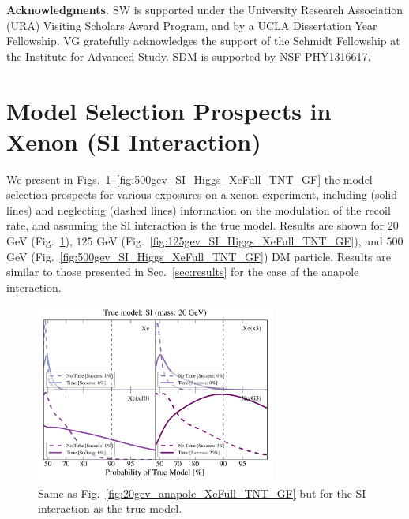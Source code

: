 \documentclass[11pt, a4paper]{article}
\newcommand{\Sec}[1]{Sec.~\ref{#1}} \newcommand{\Secs}[2]{Secs.~\ref{#1} and \ref{#2}} \newcommand{\Secm}[2]{Secs.~\ref{#1} through \ref{#2}}
\newcommand{\Fig}[1]{Fig.~\ref{#1}} \newcommand{\Figs}[2]{Figs.~\ref{#1} and \ref{#2}}
\begin{document}
\textbf{Acknowledgments.} SW is supported under the University Research Association (URA) Visiting Scholars Award Program, and by a UCLA Dissertation Year Fellowship. VG gratefully acknowledges the support of the Schmidt Fellowship at the Institute for Advanced Study. SDM is supported by NSF PHY1316617. %

\appendix

\section{Model Selection Prospects in Xenon (SI Interaction)}
We present in Figs.~\ref{fig:20gev_SI_Higgs_XeFull_TNT_GF}--\ref{fig:500gev_SI_Higgs_XeFull_TNT_GF} the model selection prospects for various exposures on a xenon experiment, including (solid lines) and neglecting (dashed lines) information on the modulation of the recoil rate, and assuming the SI interaction is the true model. Results are shown for $20$ GeV (\Fig{fig:20gev_SI_Higgs_XeFull_TNT_GF}), $125$ GeV (\Fig{fig:125gev_SI_Higgs_XeFull_TNT_GF}), and $500$ GeV (\Fig{fig:500gev_SI_Higgs_XeFull_TNT_GF}) DM particle. Results are similar to those presented in \Sec{sec:results} for the case of the anapole interaction. 


\begin{figure}
\centering
\includegraphics[width=0.7\textwidth]{plots/PDF_20GeV_SI_Higgs_50sims_Xe_Xe3x_Xe10x_XeG3_GF_TNT.pdf}
\caption{\label{fig:20gev_SI_Higgs_XeFull_TNT_GF}
Same as Fig.~\ref{fig:20gev_anapole_XeFull_TNT_GF} but for the SI interaction as the true model.}
\end{figure}
\end{document}
